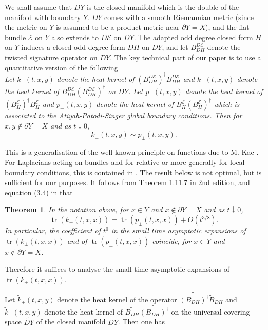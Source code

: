 \documentclass[12pt]{amsart}
\theoremstyle{plain}
\newtheorem{theorem}{Theorem}[section]
\theoremstyle{definition}
\theoremstyle{remark}
\begin{document}
{We shall assume 
that ${DY}$ is the closed manifold which is the double of the manifold with boundary $Y$. $DY$
comes with a smooth Riemannian metric (since the metric on 
$Y$ is assumed to be a product metric near $\partial Y=X$), and the flat bundle ${\mathcal E}$ on $Y$ also extends to $D{\mathcal E}$ on $DY$. 
The adapted odd degree closed form $H$ on $Y$ induces a closed odd degree form $DH$
on $DY$, and let $B_{DH}^{D{\mathcal E}}$ denote the twisted signature operator on $DY$.
The key technical part of our paper is to use
a quantitative version of the following \\

 {\em
Let $k_{+}(t,x,y)$ denote the heat kernel of $(B_{DH}^{D{\mathcal E}})^\dagger B_{DH}^{D{\mathcal E}}$
and $k_{-}(t,x,y)$ denote the heat kernel of $B_{DH}^{D{\mathcal E}}(B_{DH}^{D{\mathcal E}})^\dagger $
on $DY$.
Let $p_+(t,x,y)$ denote the heat kernel of  $(B_{H}^{\mathcal E})^\dagger B_{H}^{\mathcal E}$ 
and $p_{-}(t,x,y)$ denote the heat kernel of $B_{H}^{\mathcal E}(B_{H}^{\mathcal E})^\dagger$
which is associated to the Atiyah-Patodi-Singer global boundary conditions.
Then for $x, y \not\in \partial Y=X$ and as $t\downarrow 0$},
$$
k_\pm(t,x,y) \sim  p_\pm(t,x,y).
$$

This is a generalisation of the well known principle on functions due 
to M. Kac \cite{K}. 
For Laplacians acting on bundles and for relative or more generally for local boundary conditions, this is 
contained in \cite{DM}.
The result below is not optimal, but is sufficient for our purposes.
It follows from Theorem 1.11.7 in \cite{GilkeyBook} 2nd edition, and equation (3.4) in \cite{APS1} that

\begin{theorem}
In the notation above, for $x \in Y$ and $x\not\in \partial Y=X$ and as $t\downarrow 0$,
$$
{\operatorname{tr}}(k_\pm(t,x,x)) = {\operatorname{tr}}( p_\pm(t,x,x)) + O(t^{3/8}).
$$
In particular, the coefficient of $t^0$ in the small time asymptotic expansions of ${\operatorname{tr}}(k_\pm(t,x,x))$ and of $ {\operatorname{tr}}( p_\pm(t,x,x))$
coincide, for $x \in Y$ and $x\not\in \partial Y=X$.
\end{theorem}

Therefore it suffices to analyse the  small time asymptotic expansions of $ {\operatorname{tr}}( k_\pm(t,x,x))$. 

Let $\widetilde k_\pm(t,x,y)$ denote the heat kernel of the operator  $\widetilde{(B_{DH})^\dagger}\widetilde B_{DH}$
and $\widetilde k_{-}(t,x,y)$ denote the heat kernel of $\widetilde{B_{DH}}\widetilde{(B_{DH})^\dagger }$
on the universal covering space $\widetilde{DY}$ of the closed manifold $DY$.
Then one has

}
\end{document}
